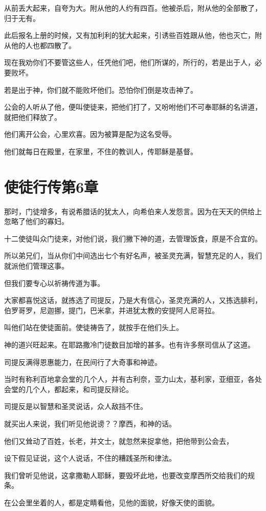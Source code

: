 \documentclass[12pt,oneside]{book}
\begin{document}
从前丢大起来，自夸为大。附从他的人约有四百。他被杀后，附从他的全部散了，归于无有。

此后报名上册的时候，又有加利利的犹大起来，引诱些百姓跟从他，他也灭亡，附从他的人也都四散了。

现在我劝你们不要管这些人，任凭他们吧，他们所谋的，所行的，若是出于人，必要败坏。

若是出于神，你们就不能败坏他们。恐怕你们倒是攻击神了。

公会的人听从了他，便叫使徒来，把他们打了，又吩咐他们不可奉耶稣的名讲道，就把他们释放了。

他们离开公会，心里欢喜。因为被算是配为这名受辱。

他们就每日在殿里，在家里，不住的教训人，传耶稣是基督。

\chapter{使徒行传第6章}
那时，门徒增多，有说希腊话的犹太人，向希伯来人发怨言。因为在天天的供给上忽略了他们的寡妇。

十二使徒叫众门徒来，对他们说，我们撇下神的道，去管理饭食，原是不合宜的。

所以弟兄们，当从你们中间选出七个有好名声，被圣灵充满，智慧充足的人，我们就派他们管理这事。

但我们要专心以祈祷传道为事。

大家都喜悦这话，就拣选了司提反，乃是大有信心，圣灵充满的人，又拣选腓利，伯罗哥罗，尼迦挪，提门，巴米拿，并进犹太教的安提阿人尼哥拉。

叫他们站在使徒面前。使徒祷告了，就按手在他们头上。

神的道兴旺起来。在耶路撒冷门徒数目加增的甚多。也有许多祭司信从了这道。

司提反满得恩惠能力，在民间行了大奇事和神迹。

当时有称利百地拿会堂的几个人，并有古利奈，亚力山太，基利家，亚细亚，各处会堂的几个人，都起来，和司提反辩论。

司提反是以智慧和圣灵说话，众人敌挡不住。

就买出人来说，我们听见他说谤？？摩西，和神的话。

他们又耸动了百姓，长老，并文士，就忽然来捉拿他，把他带到公会去，

设下假见证说，这个人说话，不住的糟践圣所和律法。

我们曾听见他说，这拿撒勒人耶稣，要毁坏此地，也要改变摩西所交给我们的规条。

在公会里坐着的人，都是定睛看他，见他的面貌，好像天使的面貌。
\end{document}
